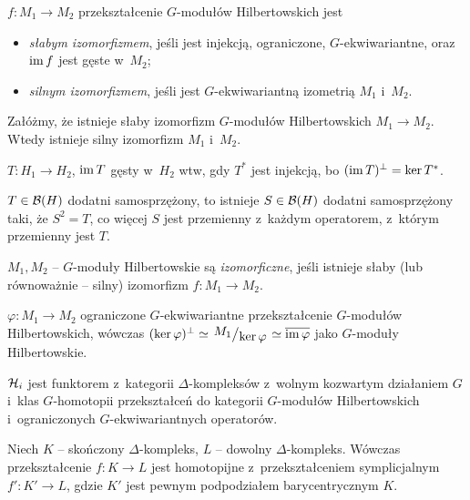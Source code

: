 \begin{definicja}[izomorfizmy]
	$f:M_1 \to M_2$ przekształcenie $G$-modułów Hilbertowskich jest
	\begin{itemize}
		\item \emph{słabym izomorfizmem}, jeśli jest injekcją,
		ograniczone, $G$-ekwiwariantne, 
		oraz ${\mathrm{im}\,} f$ jest gęste w~$M_2$;
		\item \emph{silnym izomorfizmem}, jeśli jest
		$G$-ekwiwariantną izometrią $M_1$ i~$M_2$.
	\end{itemize}
\end{definicja}

\begin{lemat}
	Załóżmy, że istnieje słaby izomorfizm $G$-modułów Hilbertowskich
	$M_1 \to M_2$. Wtedy istnieje silny izomorfizm $M_1$ i~$M_2$.
\end{lemat}

\begin{uwaga}
	$T:H_1 \to H_2$, ${\mathrm{im}\,} T$ gęsty w~$H_2$ wtw, 
	gdy $T^\ast$ jest injekcją, bo $({\mathrm{im}\,} T)^\perp = \ker T^\ast$.
\end{uwaga}

\begin{twierdzenie}[spektralne]
	$T \in {\mathcal{B}}(H)$ dodatni samosprzężony, 
	to istnieje $S \in {\mathcal{B}}(H)$ dodatni samosprzężony taki, że
	$S^2 = T$, co więcej $S$ jest przemienny z~każdym operatorem, 
	z~którym przemienny jest $T$.
\end{twierdzenie}

\begin{definicja}
	$M_1, M_2$ -- $G$-moduły Hilbertowskie są \emph{izomorficzne},
	jeśli istnieje słaby (lub równoważnie -- silny) izomorfizm
	$f : M_1 \to M_2$.
\end{definicja}

\begin{wniosek}
	$\varphi: M_1 \to M_2$ ograniczone $G$-ekwiwariantne
	przekształcenie $G$-modułów Hilbertowskich,
	wówczas $(\ker \varphi) ^\perp 
	\simeq \bigslant{M_1}{\ker \varphi} \simeq \overline{\im \varphi}$
	jako $G$-moduły Hilbertowskie.
\end{wniosek}
\pagebreak 
\begin{twierdzenie}
	${\mathcal{H}}_i$ jest funktorem z~kategorii $\Delta$-kompleksów
	z~wolnym kozwartym działaniem $G$ i~klas $G$-homotopii
	przekształceń do kategorii $G$-modułów Hilbertowskich
	i~ograniczonych $G$-ekwiwariantnych operatorów.
\end{twierdzenie}

\begin{twierdzenie}
	Niech $K$ -- skończony $\Delta$-kompleks, 
	$L$ -- dowolny $\Delta$-kompleks.
	Wówczas przekształcenie $f:K \to L$ jest homotopijne
	z~przekształceniem symplicjalnym $f':K' \to L$,
	gdzie $K'$ jest pewnym podpodziałem barycentrycznym $K$.
\end{twierdzenie}

